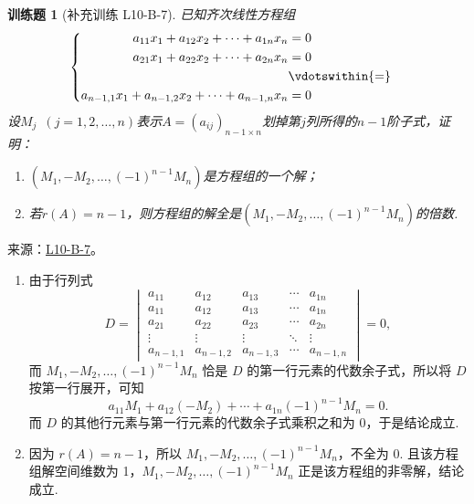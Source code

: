 \documentclass[UTF8,12pt,a4paper,fontset=fandol]{ctexart}
\newtheorem{exercise}{训练题}[section]
\begin{document}
\begin{exercise}[补充训练 L10-B-7]\label{prob:L10-B-7}
已知齐次线性方程组
        \[\begin{cases} \begin{aligned}
                    a_{11}x_1+a_{12}x_2+\cdots+a_{1n}x_n          & = 0             \\
                    a_{21}x_1+a_{22}x_2+\cdots+a_{2n}x_n          & = 0             \\
                                                                  & \vdotswithin{=} \\
                    a_{n-1,1}x_1+a_{n-1,2}x_2+\cdots+a_{n-1,n}x_n & = 0
                \end{aligned} \end{cases}\]
        设$M_j\enspace(j=1,2,\ldots,n)$表示$A=(a_{ij})_{n-1 \times n}$划掉第$j$列所得的$n-1$阶子式，证明：
        \begin{enumerate}
            \item $(M_1,-M_2,\ldots,(-1)^{n-1}M_n)$是方程组的一个解；

            \item 若$r(A)=n-1$，则方程组的解全是$(M_1,-M_2,\ldots,(-1)^{n-1}M_n)$的倍数.
        \end{enumerate}
\end{exercise}
\noindent 来源：\href{https://github.com/yhwu-is/Linear-Algebra-Left-Undone/blob/new/%E8%AE%B2%E4%B9%89/%E4%B8%93%E9%A2%98/10%20%E8%A1%8C%E5%88%97%E5%BC%8F.tex}{L10-B-7}。
\begin{solve}
\begin{enumerate}
                \item 由于行列式
                      \[ D = \begin{vmatrix}
                              a_{11}     & a_{12}     & a_{13}     & \cdots & a_{1n}     \\
                              a_{11}     & a_{12}     & a_{13}     & \cdots & a_{1n}     \\
                              a_{21}     & a_{22}     & a_{23}     & \cdots & a_{2n}     \\
                              \vdots     & \vdots     & \vdots     & \ddots & \vdots     \\
                              a_{n-1, 1} & a_{n-1, 2} & a_{n-1, 3} & \cdots & a_{n-1, n}
                          \end{vmatrix} = 0,\]
                      而 $M_1, -M_2, \ldots, (-1)^{n-1}M_n$ 恰是 $D$ 的第一行元素的代数余子式，所以将 $D$ 按第一行展开，可知\[a_{11}M_1+a_{12}(-M_2)+\cdots+a_{1n}(-1)^{n-1}M_n=0.\]
                      而 $D$ 的其他行元素与第一行元素的代数余子式乘积之和为 0，于是结论成立.

                \item 因为 $r(A) = n-1$，所以 $M_1, -M_2, \ldots, (-1)^{n-1}M_n$，不全为 0. 且该方程组解空间维数为 1，$M_1, -M_2, \ldots, (-1)^{n-1}M_n$ 正是该方程组的非零解，结论成立.
            \end{enumerate}
\end{solve}
\end{document}
